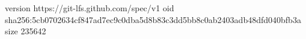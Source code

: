 version https://git-lfs.github.com/spec/v1
oid sha256:5cb0702634cf847ad7ec9c0dba5d8b83c3dd5bb8c0ab2403adb48dfd040bfb3a
size 235642
